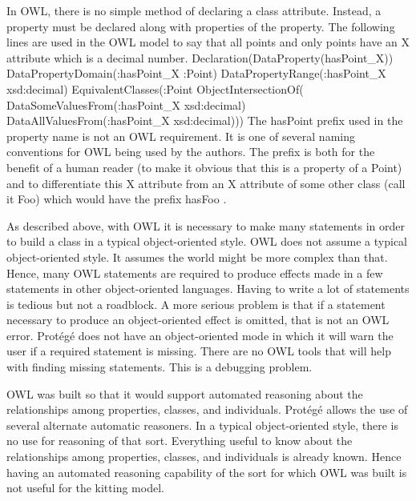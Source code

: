 In OWL, there is no simple method of declaring a class attribute. Instead,
a property must be declared along with properties of the property. The
following lines are used in the OWL model to say that all points and only
points have an X attribute which is a decimal number.
\newline
\newline \sf Declaration(DataProperty(hasPoint\_X))
\newline DataPropertyDomain(:hasPoint\_X :Point)
\newline DataPropertyRange(:hasPoint\_X xsd:decimal)
\newline EquivalentClasses(:Point ObjectIntersectionOf(
\newline \hspace*{0.2in}DataSomeValuesFrom(:hasPoint\_X xsd:decimal)
\newline \hspace*{0.2in}DataAllValuesFrom(:hasPoint\_X xsd:decimal))) \rm
\newline
\newline
The \sf hasPoint \rm prefix used in the property name is not an OWL
requirement. It is one of several naming conventions for OWL being used by
the authors. The prefix is both for the benefit of a human reader (to make
it obvious that this is a property of a Point) and to differentiate this X
attribute from an X attribute of some other class (call it \sf Foo\rm)
which would have the prefix \sf hasFoo \rm.

As described above, with OWL it is necessary to make many statements in
order to build a class in a typical object-oriented style. OWL does not
assume a typical object-oriented style. It assumes the world might be more
complex than that. Hence, many OWL statements are required to produce
effects made in a few statements in other object-oriented languages. Having
to write a lot of statements is tedious but not a roadblock. A more serious
problem is that if a statement necessary to produce an object-oriented
effect is omitted, that is not an OWL error.  Prot\'{e}g\'{e} does not have an
object-oriented mode in which it will warn the user if a required statement
is missing. There are no OWL tools that will help with finding missing
statements. This is a debugging problem.

OWL was built so that it would support automated reasoning about the
relationships among properties, classes, and individuals.  Prot\'{e}g\'{e} allows
the use of several alternate automatic reasoners. In a typical
object-oriented style, there is no use for reasoning of that sort.
Everything useful to know about the relationships among properties,
classes, and individuals is already known. Hence having an automated
reasoning capability of the sort for which OWL was built is not useful
for the kitting model.

